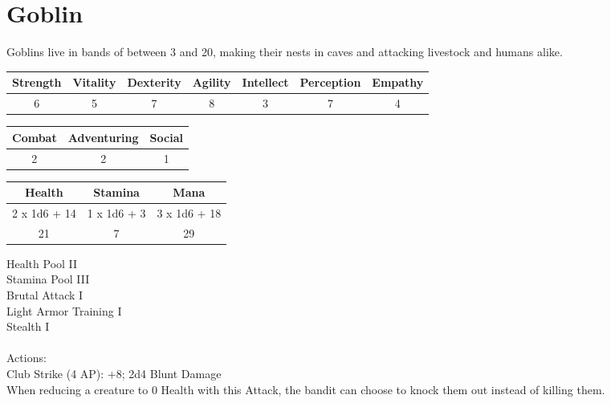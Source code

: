 \section{Goblin}

Goblins live in bands of between 3 and 20, making their nests in caves and attacking livestock and humans alike.

\begin{minipage}[H]{1\textwidth}
	\centering
	\begin{tabular}[c]{|c | c | c | c | c | c | c|}
		\hline
		Strength & Vitality & Dexterity & Agility & Intellect & Perception & Empathy\\
		\hline
		6 & 5 & 7 & 8 & 3 & 7 & 4\\
		\hline
	\end{tabular}
\end{minipage}
\bigbreak
\begin{minipage}[H]{1\textwidth}
	\centering
	\begin{tabular}[c]{|c | c | c|}
		\hline
		Combat & Adventuring & Social\\
		\hline
		2 & 2 & 1\\
		\hline
	\end{tabular}
\end{minipage}
\bigbreak
\begin{minipage}[H]{1\textwidth}
	\centering
	\begin{tabular}[c]{|c | c | c|}
		\hline
		Health & Stamina & Mana\\
		\hline
		2 x 1d6 + 14 & 1 x 1d6 + 3 & 3 x 1d6 + 18\\
		21 & 7 & 29\\
		\hline
	\end{tabular}
\end{minipage}
\noindent
Health Pool II\\
Stamina Pool III\\
Brutal Attack I\\
Light Armor Training I\\
Stealth I\\
\\
Actions:\\
Club Strike (4 AP): +8; 2d4 Blunt Damage\\
When reducing a creature to 0 Health with this Attack, the bandit can choose to knock them out instead of killing them.\\
\\
